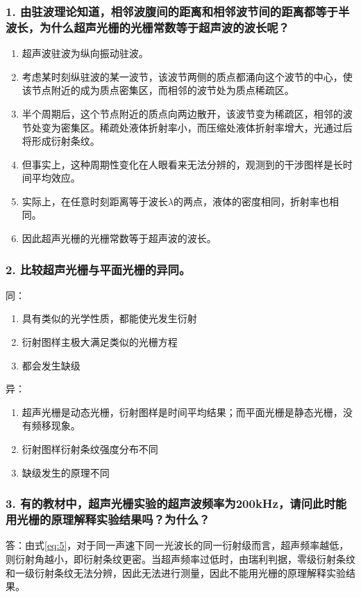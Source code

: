 \documentclass[12pt,a4paper,UTF8]{ctexart}
\begin{document}
	\subsubsection*{1. 由驻波理论知道，相邻波腹间的距离和相邻波节间的距离都等于半波长，为什么超声光栅的光栅常数等于超声波的波长呢？}
		\begin{enumerate}[label=\arabic*.]
			\item 超声波驻波为纵向振动驻波。
			\item 考虑某时刻纵驻波的某一波节，该波节两侧的质点都涌向这个波节的中心，使该节点附近的成为质点密集区，而相邻的波节处为质点稀疏区。
			\item 半个周期后，这个节点附近的质点向两边散开，该波节变为稀疏区，相邻的波节处变为密集区。稀疏处液体折射率小，而压缩处液体折射率增大，光通过后将形成衍射条纹。
			\item 但事实上，这种周期性变化在人眼看来无法分辨的，观测到的干涉图样是长时间平均效应。
			\item 实际上，在任意时刻距离等于波长$\lambda$的两点，液体的密度相同，折射率也相同。
			\item 因此超声光栅的光栅常数等于超声波的波长。
		\end{enumerate}
	\subsubsection*{2. 比较超声光栅与平面光栅的异同。}
		同：
		\begin{enumerate}[label=\arabic*.]
			\item 具有类似的光学性质，都能使光发生衍射
			\item 衍射图样主极大满足类似的光栅方程
			\item 都会发生缺级
		\end{enumerate}
		
		异：
		\begin{enumerate}[label=\arabic*.]
			\item 超声光栅是动态光栅，衍射图样是时间平均结果；而平面光栅是静态光栅，没有频移现象。
			\item 衍射图样衍射条纹强度分布不同
			\item 缺级发生的原理不同
		\end{enumerate}
	\subsubsection*{3. 有的教材中，超声光栅实验的超声波频率为200kHz，请问此时能用光栅的原理解释实验结果吗？为什么？}
		答：由式\ref{eq:5}，对于同一声速下同一光波长的同一衍射级而言，超声频率越低，则衍射角越小，即衍射条纹更密。当超声频率过低时，由瑞利判据，零级衍射条纹和一级衍射条纹无法分辨，因此无法进行测量，因此不能用光栅的原理解释实验结果。
\end{document}
